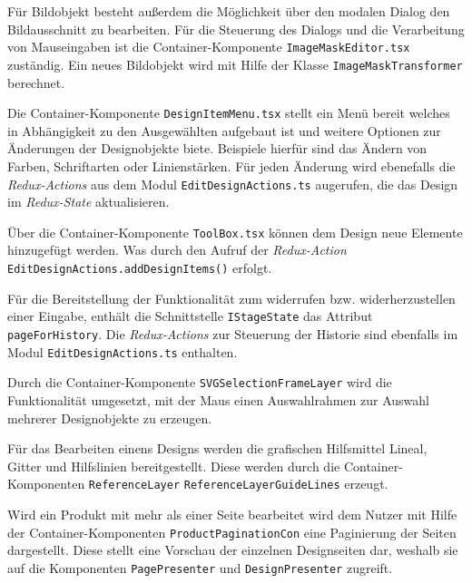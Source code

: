Für Bildobjekt besteht außerdem die Möglichkeit über den modalen Dialog den Bildausschnitt zu bearbeiten. Für die Steuerung des Dialogs und die Verarbeitung von Mauseingaben ist die Container-Komponente \lstinline|ImageMaskEditor.tsx| zuständig. Ein neues Bildobjekt wird mit Hilfe der Klasse \lstinline|ImageMaskTransformer| berechnet. 

Die Container-Komponente \lstinline|DesignItemMenu.tsx| stellt ein Menü bereit welches in Abhängigkeit zu den Ausgewählten aufgebaut ist und weitere Optionen zur Änderungen der Designobjekte biete. Beispiele hierfür sind das Ändern von Farben, Schriftarten oder Linienstärken. Für jeden Änderung wird ebenefalls die \emph{Redux-Actions}  aus dem Modul \lstinline|EditDesignActions.ts| augerufen, die das Design im \emph{Redux-State} aktualisieren.

Über die Container-Komponente \lstinline|ToolBox.tsx| können dem Design neue Elemente hinzugefügt werden.  Was durch den Aufruf der \emph{Redux-Action}  \lstinline|EditDesignActions.addDesignItems()| erfolgt.

Für die Bereitstellung der Funktionalität zum widerrufen bzw. widerherzustellen einer Eingabe, enthält die Schnittstelle \lstinline|IStageState| das Attribut \lstinline|pageForHistory|. 
Die \emph{Redux-Actions} zur Steuerung der Historie sind ebenfalls im Modul \lstinline|EditDesignActions.ts| enthalten.

Durch die Container-Komponente \lstinline|SVGSelectionFrameLayer| wird die Funktionalität umgesetzt, mit der Maus einen Auswahlrahmen zur Auswahl mehrerer Designobjekte zu erzeugen. 

Für das Bearbeiten einens Designs werden die grafischen Hilfsmittel Lineal, Gitter und Hilfslinien bereitgestellt.
Diese werden durch die Container-Komponenten \lstinline|ReferenceLayer| \lstinline|ReferenceLayerGuideLines| erzeugt. 

Wird ein Produkt mit mehr als einer Seite bearbeitet wird dem Nutzer mit Hilfe der Container-Komponenten \lstinline|ProductPaginationCon| eine Paginierung der Seiten dargestellt. Diese stellt eine Vorschau der einzelnen Designseiten dar, weshalb sie auf die Komponenten \lstinline|PagePresenter| und \lstinline|DesignPresenter| zugreift.





